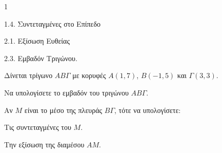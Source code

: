 \begin{ylh}{1}
    \item 1.4. Συντεταγμένες στο Επίπεδο
    \item 2.1. Εξίσωση Ευθείας
    \item 2.3. Εμβαδόν Τριγώνου.
\end{ylh}
Δίνεται τρίγωνο $AB\Gamma$ με κορυφές $A(1,7)$, $B(-1,5)$ και $\Gamma(3,3)$.
\begin{alist}
    \item Να υπολογίσετε το εμβαδόν του τριγώνου $AB\Gamma$. 
    \item Αν $M$ είναι το μέσο της πλευράς $B\Gamma$, τότε να υπολογίσετε:
    \begin{rlist}
        \item Τις συντεταγμένες του $M$.
        \item Την εξίσωση της διαμέσου $AM$. 
    \end{rlist}
\end{alist}